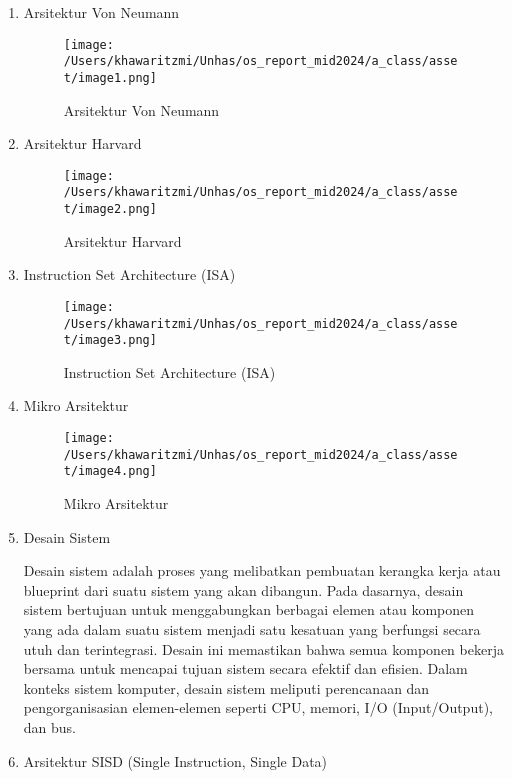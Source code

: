 \documentclass[12pt]{article}
\begin{document}
\begin{enumerate} 
    \item Arsitektur Von Neumann
    \begin{figure}[h]
        \centering
        \texttt{[image: /Users/khawaritzmi/Unhas/os\_report\_mid2024/a\_class/asset/image1.png]}  %
        \caption{Arsitektur Von Neumann}
        \label{fig:contoh_gambar}
    \end{figure}
    \item Arsitektur Harvard
    \begin{figure}[h]
        \centering
        \texttt{[image: /Users/khawaritzmi/Unhas/os\_report\_mid2024/a\_class/asset/image2.png]}  %
        \caption{Arsitektur Harvard}
        \label{fig:contoh_gambar}
    \end{figure}
    \item Instruction Set Architecture (ISA)
    \begin{figure}[h]
        \centering
        \texttt{[image: /Users/khawaritzmi/Unhas/os\_report\_mid2024/a\_class/asset/image3.png]}  %
        \caption{Instruction Set Architecture (ISA)}
        \label{fig:contoh_gambar}
    \end{figure}
    \item Mikro Arsitektur
    \begin{figure}[h]
        \centering
        \texttt{[image: /Users/khawaritzmi/Unhas/os\_report\_mid2024/a\_class/asset/image4.png]}  %
        \caption{Mikro Arsitektur}
        \label{fig:contoh_gambar}
    \end{figure}
    \item Desain Sistem

      Desain sistem adalah proses yang melibatkan pembuatan kerangka kerja atau blueprint dari suatu sistem yang akan dibangun. Pada dasarnya, desain sistem bertujuan untuk menggabungkan berbagai elemen atau komponen yang ada dalam suatu sistem menjadi satu kesatuan yang berfungsi secara utuh dan terintegrasi. Desain ini memastikan bahwa semua komponen bekerja bersama untuk mencapai tujuan sistem secara efektif dan efisien. Dalam konteks sistem komputer, desain sistem meliputi perencanaan dan pengorganisasian elemen-elemen seperti CPU, memori, I/O (Input/Output), dan bus.

      \item Arsitektur SISD (Single Instruction, Single Data)
      

\end{enumerate}
\end{document}
